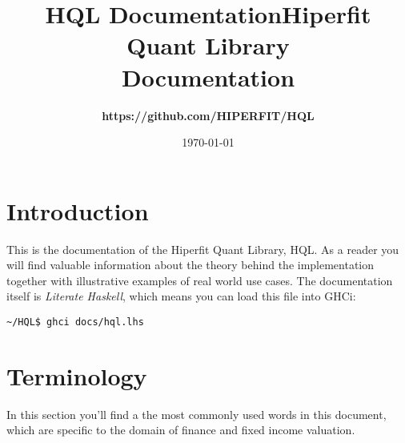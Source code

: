 \documentclass[11pt,a4paper]{article}
\def\Author{
\bf https://github.com/HIPERFIT/HQL
}
\def\Title{\bf Hiperfit Quant Library \\ Documentation}
\numberwithin{equation}{section}
\begin{document}
\title{HQL Documentation}

\title{\Title}
\author{\Author}
\date{\today}
\maketitle

\tableofcontents

\FrameSep

\section{Introduction}
This is the documentation of the Hiperfit Quant Library, HQL. As a reader you will
find valuable information about the theory behind the implementation together with
illustrative examples of real world use cases. The documentation itself is \textit{Literate Haskell}\cite{LitHaskell},
which means you can load this file into GHCi:

\FrameSep
\begin{lstlisting}
~/HQL$ ghci docs/hql.lhs
\end{lstlisting}

\section{Terminology}
In this section you'll find a the most commonly used words in this document, which are specific to the domain of finance and fixed income valuation.

\end{document}
